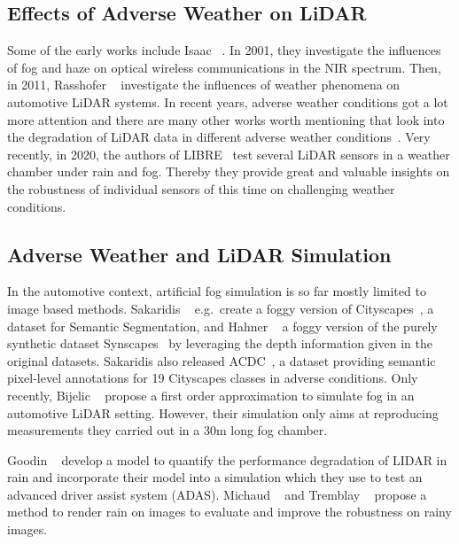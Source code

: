 \documentclass[10pt,twocolumn,letterpaper]{article}
\begin{document}
\subsection{Effects of Adverse Weather on LiDAR}
\label{sec:related_lidar}
Some of the early works include Isaac \etal~\cite{Isaac}. In 2001, they investigate the influences of fog and haze on optical wireless communications in the NIR spectrum. Then, in 2011, Rasshofer \etal~\cite{Rasshofer_2011} investigate the influences of weather phenomena on automotive LiDAR systems. In recent years, adverse weather conditions got a lot more attention and there are many other works worth mentioning that look into the degradation of LiDAR data in different adverse weather conditions~\cite{Wojtanowski, Filgueira, Kutila, Jokela, Heinzler, Wallace, Li, Kutila2}. Very recently, in 2020, the authors of LIBRE~\cite{LIBRE} test several LiDAR sensors in a weather chamber under rain and fog. Thereby they provide great and valuable insights on the robustness of individual sensors of this time on challenging weather conditions.


\subsection{Adverse Weather and LiDAR Simulation}
\label{sec:related_simulation}

In the automotive context, artificial fog simulation is so far mostly limited to image based methods. Sakaridis \etal~\cite{SDV18} e.g.\ create a foggy version of Cityscapes~\cite{Cityscapes}, a dataset for Semantic Segmentation, and Hahner \etal~\cite{FoggySynscapes} a foggy version of the purely synthetic dataset Synscapes~\cite{Synscapes} by leveraging the depth information given in the original datasets. Sakaridis \etal also released ACDC~\cite{ACDC}, a dataset providing semantic pixel-level annotations for 19 Cityscapes classes in adverse conditions. Only recently, Bijelic \etal~\cite{STF} propose a first order approximation to simulate fog in an automotive LiDAR setting. However, their simulation only aims at reproducing measurements they carried out in a 30m long fog chamber. 

Goodin \etal~\cite{Goodin} develop a model to quantify the performance degradation of LIDAR in rain and incorporate their model into a simulation which they use to test an advanced driver assist system (ADAS). 
Michaud \etal~\cite{Michaud2015TowardsCT} and Tremblay \etal~\cite{Tremblay} propose a method to render rain on images to evaluate and improve the robustness on rainy images. 
\end{document}
